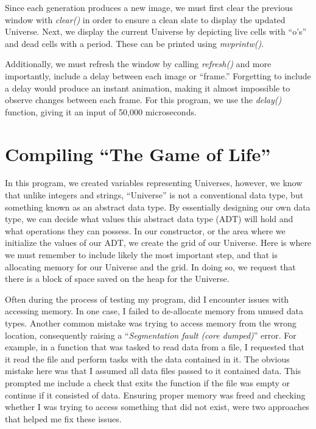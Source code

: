 \documentclass[12pt]{article}
\begin{document}
\vspace{0.2in}

Since each generation produces a new image, we must first clear the previous window with \textit{clear()} in order to ensure a clean slate to display the updated Universe. Next, we display the current Universe by depicting live cells with \enquote{o's} and dead cells with a period. These can be printed using \textit{mvprintw()}.

\vspace{0.2in}

Additionally, we must refresh the window by calling \textit{refresh()} and more importantly, include a delay between each image or \enquote{frame.} Forgetting to include a delay would produce an instant animation, making it almost impossible to observe changes between each frame. For this program, we use the \textit{delay()} function, giving it an input of 50,000 microseconds.

\section{Compiling \enquote{The Game of Life}}

In this program, we created variables representing Universes, however, we know that unlike integers and strings, \enquote{Universe} is not a conventional data type, but something known as an abstract data type. By essentially designing our own data type, we can decide what values this abstract data type (ADT) will hold and what operations they can possess. In our constructor, or the area where we initialize the values of our ADT, we create the grid of our Universe. Here is where we must remember to include likely the most important step, and that is allocating memory for our Universe and the grid. In doing so, we request that there is a block of space saved on the heap for the Universe. 

\vspace{0.2in}

Often during the process of testing my program, did I encounter issues with accessing memory. In one case, I failed to de-allocate memory from unused data types. Another common mistake was trying to access memory from the wrong location, consequently raising a \enquote{\textit{Segmentation fault (core dumped)}} error. For example, in a function that was tasked to read data from a file, I requested that it read the file and perform tasks with the data contained in it. The obvious mistake here was that I assumed all data files passed to it contained data. This prompted me include a check that exits the function if the file was empty or continue if it consisted of data. Ensuring proper memory was freed and checking whether I was trying to access something that did not exist, were two approaches that helped me fix these issues.
\end{document}
